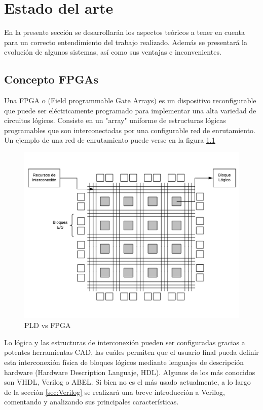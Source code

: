 \chapter{Estado del arte}\label{sec:Estado_arte}
En la presente sección se desarrollarán los aspectos teóricos a tener en cuenta para un correcto entendimiento del trabajo realizado. Además se presentará la evolución de algunos sistemas, así como sus ventajas e inconvenientes.
\section{Concepto FPGAs}
Una FPGA o (Field programmable Gate Arrays) es un dispositivo reconfigurable que puede ser eléctricamente programado para implementar una alta variedad de circuitos lógicos. Consiste en un "array" uniforme de estructuras lógicas programables que son interconectadas por una configurable red de enrutamiento. Un ejemplo de una red de enrutamiento puede verse en la figura \ref{fig:estructura_FPGA}

\begin{center}
	\begin{figure}[H]
		\center
		\includegraphics[trim = 0mm 10mm 0mm 10mm, clip,scale=0.4]{imagenes/EstadoArte/estructura_FPGA.pdf}
		\caption{PLD vs FPGA}
		\label{fig:estructura_FPGA}
	\end{figure}
\end{center}
 Lo lógica y las estructuras de interconexión pueden ser configuradas gracias a potentes herramientas CAD, las cuáles permiten que el usuario final pueda definir esta interconexión física de bloques lógicos mediante lenguajes de descripción hardware (Hardware Description Languaje, HDL). Algunos de los más conocidos son VHDL, Verilog o ABEL. 
\newline
Si bien no es el más usado actualmente, a lo largo de la sección \ref{sec:Verilog} se realizará una breve introducción a Verilog, comentando y analizando sus principales características.
\newpage
